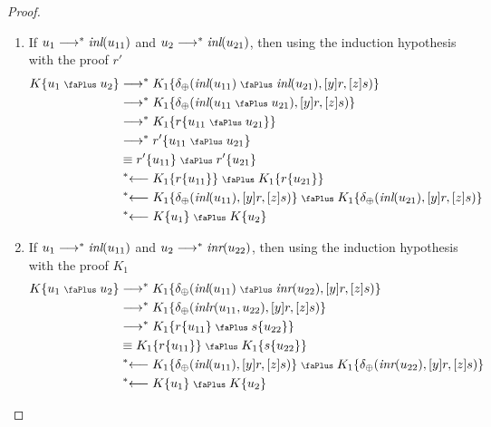 \documentclass[screen, sigconf,authorversion,nonacm]{acmart}
\theoremstyle{acmdefinition}
\numberwithin{equation}{section}
\newcommand\abstr[1]{[#1]}
\newcommand\inl{\mbox{\it inl}}
\newcommand\inr{\mbox{\it inr}}
\newcommand\inlr{\mbox{\it inlr}}
\newcommand\plus{\mathrel{\text{\normalfont\scalebox{0.7}{\faPlus}}}}
\newcommand\lra{\longrightarrow}
\newcommand\lras{\lra^*}
\newcommand\llas{\mathrel{{}^*{\longleftarrow}}}
\newcommand\elimplus{\delta_{\oplus}}
\begin{document}
\begin{proof}
\begin{itemize}
\begin{itemize}
          \begin{enumerate}
          \item\label{caseA} If $u_1 \lras \inl(u_{11})$ and $u_2 \lras \inl(u_{21})$,
          then using the induction hypothesis with the proof $r'$ 
\begin{align*}
     K\{u_1 \plus u_2\}
     &\lras K_1 \{\elimplus(\inl(u_{11}) \plus \inl(u_{21}),
        \abstr{y}r, \abstr{z}s)\}\\
     &\lras K_1 \{\elimplus(\inl(u_{11} \plus u_{21}),
        \abstr{y}r, \abstr{z}s)\}\\
     &\lras K_1 \{r\{u_{11} \plus u_{21}\}\}\\
     &\lras r'\{u_{11} \plus u_{21}\}\\
     &\equiv r'\{u_{11}\} \plus r'\{u_{21}\}\\
     &\llas  K_1\{r\{u_{11}\}\} \plus K_1\{r\{u_{21}\}\}\\
     &\llas K_1 \{\elimplus(\inl(u_{11}),\abstr{y}r,\abstr{z}s)\}
            \plus K_1 \{\elimplus(\inl(u_{21}),\abstr{y}r,\abstr{z}s)\}\\
     &\llas K\{u_1\} \plus K\{u_2\}
\end{align*}

       \item\label{caseB} If $u_1 \lras \inl(u_{11})$ and $u_2 \lras \inr(u_{22})$,
         then using the induction hypothesis with the proof $K_1$
\begin{align*}
     K\{u_1 \plus u_2\}
     &\lras K_1 \{\elimplus(\inl(u_{11}) \plus \inr(u_{22}),
        \abstr{y}r, \abstr{z}s)\}\\
     &\lras K_1 \{\elimplus(\inlr(u_{11},u_{22}),
        \abstr{y}r, \abstr{z}s)\}\\
     &\lras K_1 \{r\{u_{11}\} \plus s\{u_{22}\}\}\\
     &\equiv K_1\{r\{u_{11}\}\} \plus K_1\{s\{u_{22}\}\}\\
     &\llas K_1 \{\elimplus(\inl(u_{11}),\abstr{y}r,\abstr{z}s)\}
            \plus K_1 \{\elimplus(\inr(u_{22}),\abstr{y}r,\abstr{z}s)\}\\
     &\llas K\{u_1\} \plus K\{u_2\}
\end{align*}


\end{enumerate}
\end{itemize}
\end{itemize}
\end{proof}
\end{document}
